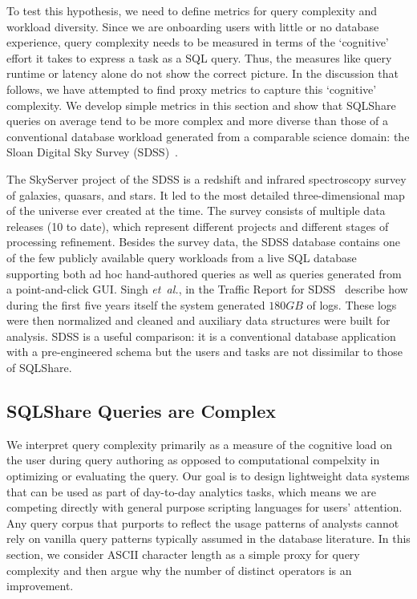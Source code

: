 \documentclass{sig-alternate}
\newcommand{\note}[2]{{\color{#1} {#2}}}
\newcommand{\reviewone}[1]{\note{black}{#1}}
\newcommand{\ea}{{\em et~al.}\xspace}
\newcommand{\sqlshare}{SQLShare}
\begin{document}
To test this hypothesis, we need to define metrics for query complexity and workload diversity. \reviewone{Since we are onboarding users with little or no database experience, query complexity needs to be measured in terms of the `cognitive' effort it takes to express a task as a SQL query. Thus, the measures like query runtime or latency alone do not show the correct picture. In the discussion that follows, we have attempted to find proxy metrics to capture this `cognitive' complexity.} We develop simple metrics in this section and show that \sqlshare{} queries on average tend to be more complex and more diverse than those of a conventional database workload generated from a comparable science domain: the Sloan Digital Sky Survey (SDSS)~\cite{kent1994sloan}.

The SkyServer project of the SDSS is a redshift and infrared spectroscopy survey of galaxies, quasars, and stars.
It led to the most detailed three-dimensional map of the universe ever created at the time.
The survey consists of multiple data releases (10 to date), which represent different projects and different stages of processing
refinement. Besides the survey data, the SDSS database contains one of the few publicly available query workloads from a live SQL database supporting both ad hoc
hand-authored queries as well as queries generated from a point-and-click GUI. Singh \ea, in the Traffic Report for SDSS~\cite{singh2007skyserver} describe how during the first five years itself the system generated $180GB$ of logs. These logs were then normalized and cleaned and auxiliary data structures were built for analysis.
SDSS is a useful comparison: it is a conventional database application with a pre-engineered schema but the users and tasks are not dissimilar to those of \sqlshare{}.

\subsection{\sqlshare{} Queries are Complex}

We interpret query complexity primarily as a measure of the cognitive load on the user during query authoring as opposed to computational compelxity in optimizing or evaluating the query.  Our goal is to design lightweight data systems that can be used as part of day-to-day analytics tasks, which means we are competing directly with general purpose scripting languages for users' attention.  Any query corpus that purports to reflect the usage patterns of analysts cannot rely on vanilla query patterns typically assumed in the database literature. 
In this section, we consider ASCII character length as a simple proxy for query complexity and then argue why the number of distinct operators is an improvement.
\end{document}
